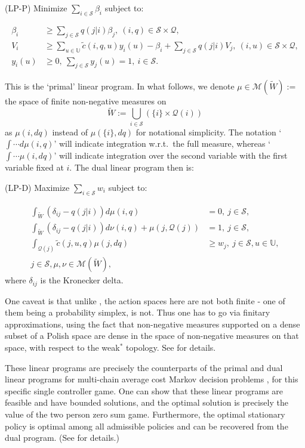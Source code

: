 \documentclass[notitlepage,11pt,reqno]{amsart}
\numberwithin{equation}{section}
\theoremstyle{plain}
\theoremstyle{definition}
\theoremstyle{remark}
\newcommand{\Act}{{\mathds{U}}}
\newcommand{\cS}{{\mathcal{S}}}     %
\newcommand{\PW}{\mathcal{M}(\widetilde{W})}
\begin{document}
\bigskip

\noindent (LP-P) Minimize $\sum_{i\in\cS}\beta_i$ subject to:

\begin{align*}
\beta_i &\geq \sum_{j\in\cS}q(j|i)\beta_j, \ (i,q)\in\cS\times\mathcal{Q},
\\
V_i &\geq \sum_{u\in\Act}\tilde{c}(i,q,u)y_i(u) - \beta_i + \sum_{j\in\cS}q(j|i)V_j, \ (i,u) \in \cS\times\mathcal{Q},
\\
y_i(u)&\geq 0, \ \sum_{j\in \cS} y_j(u) = 1, \ i \in \cS.
\end{align*}

This is the `primal' linear program. In what follows, we denote $\mu\in \PW :=$ the space of finite non-negative measures on
$$\widetilde{W} := \bigcup_{i\in\cS}(\{i\}\times\mathcal{Q}(i))$$ 
as $\mu(i,dq)$ instead of $\mu(\{i\},dq)$ for notational simplicity. The notation `$\int\cdots d\mu(i,q)$' will indicate integration w.r.t.\ the full measure, whereas `$\int\cdots \mu(i,dq)$' will indicate integration over the second variable with the first variable fixed at $i$. The dual linear program then is:

\bigskip


\noindent (LP-D) Maximize $\sum_{i\in\cS} w_i$ subject to:

\begin{align}
\int_{\widetilde{W}}
(\delta_{ij} - q(j|i))d\mu(i,q) &= 0, \ j\in\cS,  \nonumber 
\\
\int_{\widetilde{W}}(\delta_{ij} - q(j|i))d\nu(i,q) + \mu(j,\mathcal{Q}(j)) &= 1, \ j\in\cS, \nonumber \\
\int_{\mathcal{Q}(j)}\tilde{c}(j,u,q)\mu(j,dq) &\geq w_j, \ j\in\cS, u\in\Act, \label{LPline}\\
j\in\cS, \mu,\nu\in\PW, \nonumber
\end{align}
where $\delta_{ij}$ is the Kronecker delta.

One caveat is that unlike \cite{V1981}, the action spaces here are not both finite - one of them being a probability simplex, is not. Thus one has to go via finitary approximations, using the fact that non-negative measures supported on a dense subset of a Polish space are dense in the space of non-negative measures on that space, with respect to the weak$^*$ topology. See \cite{9683319} for details. 

These linear programs are precisely the counterparts of the primal and dual linear programs for multi-chain average cost Markov decision problems \cite{DF}, \cite{Kal} for this specific single controller game. One can show that these linear programs are feasible and have bounded solutions, and the optimal solution is precisely the value of the two person zero sum game. Furthermore, the optimal stationary policy is optimal among all admissible policies and can be recovered from the dual program. (See \cite{9683319} for details.)
\end{document}
